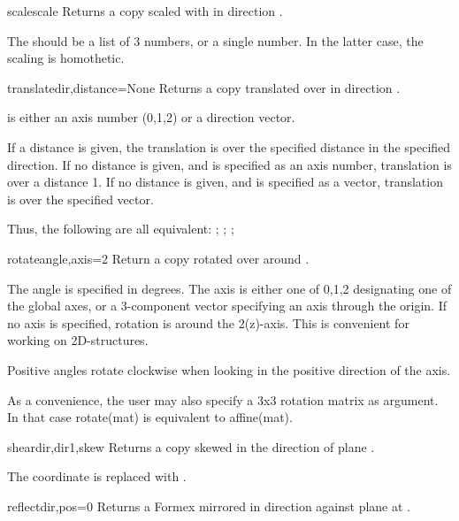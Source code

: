 {{\begin{methoddesc}{scale}{scale}
Returns a copy scaled with  in direction .

The  should be a list of 3 numbers, or a single number. In the latter case, the scaling is homothetic.
\end{methoddesc}

\begin{methoddesc}{translate}{dir,distance=None}
Returns a copy translated over  in direction .

 is either an axis number (0,1,2) or a direction vector.

If a distance is given, the translation is over the specified
distance in the specified direction.
If no distance is given, and  is specified as an axis number,
translation is over a distance 1.
If no distance is given, and  is specified as a vector, translation
is over the specified vector.

Thus, the following are all equivalent:
;
;
;
\end{methoddesc}

\begin{methoddesc}{rotate}{angle,axis=2}
Return a copy rotated over  around .

The angle is specified in degrees.
The axis is either one of 0,1,2 designating one of the global axes,
or a 3-component vector specifying an axis through the origin.
If no axis is specified, rotation is around the 2(z)-axis. This is
convenient for working on 2D-structures.

Positive angles rotate clockwise when looking in the positive direction of the axis.

As a convenience, the user may also specify a 3x3 rotation matrix as argument.
In that case rotate(mat) is equivalent to affine(mat).
\end{methoddesc}


\begin{methoddesc}{shear}{dir,dir1,skew}
Returns a copy skewed in the direction  of plane .

The coordinate  is replaced with .
\end{methoddesc}

\begin{methoddesc}{reflect}{dir,pos=0}
Returns a Formex mirrored in direction  against plane at .


\end{methoddesc}}}
